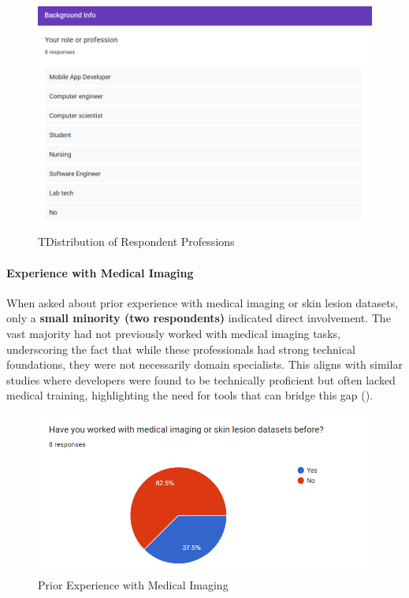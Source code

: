\documentclass[
  12pt,
  oneside]{article}
\begin{document}
\begin{figure}

{\centering \includegraphics[width=1\linewidth]{technical-user-chart1} 

}

\caption{TDistribution of Respondent Professions}\label{fig:unnamed-chunk-8}
\end{figure}

\paragraph{Experience with Medical
Imaging}\label{experience-with-medical-imaging}

When asked about prior experience with medical imaging or skin lesion
datasets, only a \textbf{small minority (two respondents)} indicated
direct involvement. The vast majority had not previously worked with
medical imaging tasks, underscoring the fact that while these
professionals had strong technical foundations, they were not
necessarily domain specialists. This aligns with similar studies where
developers were found to be technically proficient but often lacked
medical training, highlighting the need for tools that can bridge this
gap ().

\begin{figure}

{\centering \includegraphics[width=1\linewidth]{technical-user-chart2} 

}

\caption{Prior Experience with Medical Imaging}\label{fig:unnamed-chunk-9}
\end{figure}
\end{document}
